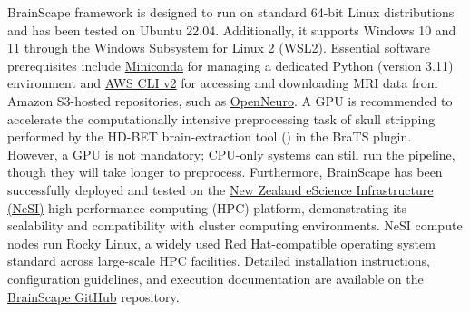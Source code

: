 BrainScape framework is designed to run on standard 64-bit Linux distributions and has been tested on Ubuntu 22.04. 
Additionally, it supports Windows 10 and 11 through the \href{https://learn.microsoft.com/en-gb/windows/wsl}{Windows Subsystem for Linux 2 (WSL2)}.
Essential software prerequisites include \href{https://www.anaconda.com/docs/getting-started/miniconda/main}{Miniconda} for managing 
a dedicated Python (version 3.11) environment  
and \href{https://docs.aws.amazon.com/cli/latest/userguide/getting-started-install.html}{AWS CLI v2} for accessing and 
downloading MRI data from Amazon S3-hosted repositories, such as \href{https://openneuro.org/}{OpenNeuro}. 
A GPU is recommended to accelerate the computationally intensive preprocessing task of skull stripping 
performed by the HD-BET brain-extraction tool (\cite{isensee2019automated}) in the BraTS plugin. 
However, a GPU is not mandatory; CPU-only systems can still run the pipeline, though they will take longer to preprocess.
Furthermore, BrainScape has been successfully deployed and tested on the 
\href{https://www.nesi.org.nz/}{New Zealand eScience Infrastructure (NeSI)} 
high-performance computing (HPC) platform, demonstrating its scalability and compatibility with cluster computing environments. 
NeSI compute nodes run Rocky Linux, a widely used Red Hat-compatible operating system standard across large-scale HPC facilities. 
Detailed installation instructions, configuration guidelines, and execution documentation are available on
the \href{https://github.com/yasinzaii/BrainScape}{BrainScape GitHub} repository.

